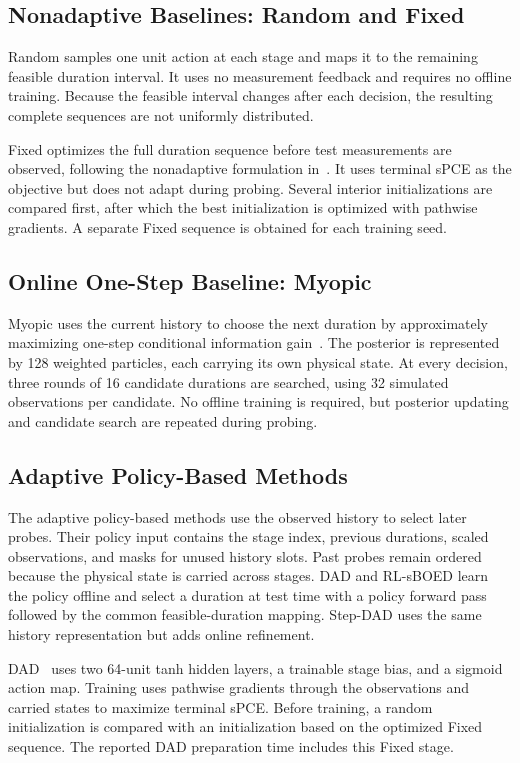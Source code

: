 \documentclass[conference,letterpaper]{IEEEtran}
\begin{document}
\subsection{Nonadaptive Baselines: Random and Fixed}
Random samples one unit action at each stage and maps it to the remaining feasible duration interval. It uses no measurement feedback and requires no offline training. Because the feasible interval changes after each decision, the resulting complete sequences are not uniformly distributed.

Fixed optimizes the full duration sequence before test measurements are observed, following the nonadaptive formulation in~\cite[Sec.~2.4]{huan2016sequential}. It uses terminal sPCE as the objective but does not adapt during probing. Several interior initializations are compared first, after which the best initialization is optimized with pathwise gradients. A separate Fixed sequence is obtained for each training seed.

\subsection{Online One-Step Baseline: Myopic}
Myopic uses the current history to choose the next duration by approximately maximizing one-step conditional information gain~\cite[Sec.~2.4]{huan2016sequential}. The posterior is represented by 128 weighted particles, each carrying its own physical state. At every decision, three rounds of 16 candidate durations are searched, using 32 simulated observations per candidate. No offline training is required, but posterior updating and candidate search are repeated during probing.

\subsection{Adaptive Policy-Based Methods}
The adaptive policy-based methods use the observed history to select later probes. Their policy input contains the stage index, previous durations, scaled observations, and masks for unused history slots. Past probes remain ordered because the physical state is carried across stages. DAD and RL-sBOED learn the policy offline and select a duration at test time with a policy forward pass followed by the common feasible-duration mapping. Step-DAD uses the same history representation but adds online refinement.

DAD~\cite{foster2021dad} uses two 64-unit tanh hidden layers, a trainable stage bias, and a sigmoid action map. Training uses pathwise gradients through the observations and carried states to maximize terminal sPCE. Before training, a random initialization is compared with an initialization based on the optimized Fixed sequence. The reported DAD preparation time includes this Fixed stage.
\end{document}
